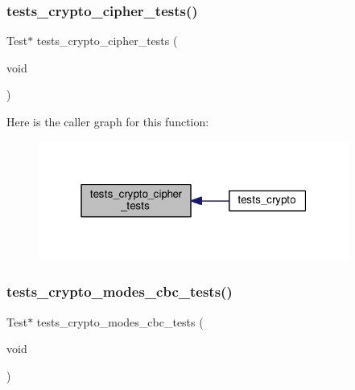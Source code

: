 \subsubsection{\texorpdfstring{tests\+\_\+crypto\+\_\+cipher\+\_\+tests()}{tests\_crypto\_cipher\_tests()}}
{\footnotesize\ttfamily Test$\ast$ tests\+\_\+crypto\+\_\+cipher\+\_\+tests (\begin{DoxyParamCaption}\item[{void}]{ }\end{DoxyParamCaption})}

Here is the caller graph for this function\+:
\nopagebreak
\begin{figure}[H]
\begin{center}
\leavevmode
\includegraphics[width=289pt]{group__unittests_ga0da52ebef74d5bf263ce63858f7dea0c_icgraph}
\end{center}
\end{figure}
\mbox{\label{group__unittests_gada776e0b50a5f95f2f3eb86d94d83791}} 
\subsubsection{\texorpdfstring{tests\+\_\+crypto\+\_\+modes\+\_\+cbc\+\_\+tests()}{tests\_crypto\_modes\_cbc\_tests()}}
{\footnotesize\ttfamily Test$\ast$ tests\+\_\+crypto\+\_\+modes\+\_\+cbc\+\_\+tests (\begin{DoxyParamCaption}\item[{void}]{ }\end{DoxyParamCaption})}

